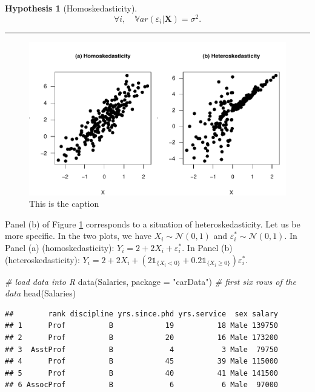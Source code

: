 \documentclass[
]{book}
\newenvironment{Shaded}{\begin{snugshade}}{\end{snugshade}}
\newcommand{\AttributeTok}[1]{\textcolor[rgb]{0.77,0.63,0.00}{#1}}
\newcommand{\CommentTok}[1]{\textcolor[rgb]{0.56,0.35,0.01}{\textit{#1}}}
\newcommand{\FunctionTok}[1]{\textcolor[rgb]{0.00,0.00,0.00}{#1}}
\newcommand{\NormalTok}[1]{#1}
\newcommand{\StringTok}[1]{\textcolor[rgb]{0.31,0.60,0.02}{#1}}
\theoremstyle{definition}
\theoremstyle{definition}
\theoremstyle{definition}
\theoremstyle{definition}
\newtheorem{hypothesis}{Hypothesis}[chapter]
\theoremstyle{remark}
\begin{document}
\begin{hypothesis}[Homoskedasticity]
\protect\hypertarget{hyp:homoskedasticity}{}\label{hyp:homoskedasticity}\[
\forall i, \quad \mathbb{V}ar(\varepsilon_i|\mathbf{X}) = \sigma^2.
\]
\end{hypothesis}

\begin{center}\rule{0.5\linewidth}{0.5pt}\end{center}

\begin{figure}

{\centering \includegraphics[width=0.9\linewidth]{bookdown-demo_files/figure-latex/heteroskedasticity-1} 

}

\caption{This is the caption}\label{fig:heteroskedasticity}
\end{figure}

Panel (b) of Figure \ref{fig:heteroskedasticity} corresponds to a situation of heteroskedasticity. Let us be more specific. In the two plots, we have \(X_i \sim \mathcal{N}(0,1)\) and \(\varepsilon^*_i \sim \mathcal{N}(0,1)\). In Panel (a) (homoskedasticity): \(Y_i = 2 + 2X_i + \varepsilon^*_i\). In Panel (b) (heteroskedasticity): \(Y_i = 2 + 2X_i + \left(2\mathbb{1}_{\{X_i<0\}}+0.2\mathbb{1}_{\{X_i\ge0\}}\right)\varepsilon^*_i\).

\begin{Shaded}
\begin{Highlighting}[]
\CommentTok{\# load data into R}
\FunctionTok{data}\NormalTok{(Salaries, }\AttributeTok{package =} \StringTok{"carData"}\NormalTok{)}
\CommentTok{\# first six rows of the data}
\FunctionTok{head}\NormalTok{(Salaries)}
\end{Highlighting}
\end{Shaded}

\begin{verbatim}
##        rank discipline yrs.since.phd yrs.service  sex salary
## 1      Prof          B            19          18 Male 139750
## 2      Prof          B            20          16 Male 173200
## 3  AsstProf          B             4           3 Male  79750
## 4      Prof          B            45          39 Male 115000
## 5      Prof          B            40          41 Male 141500
## 6 AssocProf          B             6           6 Male  97000
\end{verbatim}
\end{document}
